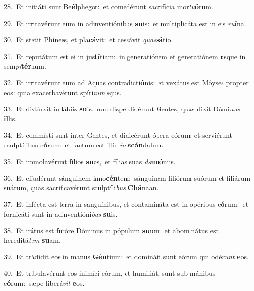 {\numbfont\textcolor{\numbcolor}{28.}}~Et initiáti sunt Be\-\textbf{él}\-phegor:~\star et comedérunt sacrifícia mor\-\textit{tu}\-\textbf{ó}rum.\par
{\numbfont\textcolor{\numbcolor}{29.}}~Et irritavérunt eum in adinventiónibus \textbf{su}\-is:~\star et multiplicáta est in eis \textit{ru}\-\textbf{í}na.\par
{\numbfont\textcolor{\numbcolor}{30.}}~Et stetit Phínees, et pla\-\textbf{cá}\-vit:~\star et cessávit \textit{quas}\-\textbf{sá}tio.\par
{\numbfont\textcolor{\numbcolor}{31.}}~Et reputátum est ei in jus\-\textbf{tí}\-tiam:~\star in generatiónem et generatiónem usque in sem\-\textit{pi}\-\textbf{tér}num.\par
{\numbfont\textcolor{\numbcolor}{32.}}~Et irritavérunt eum ad Aquas contradicti\-\textbf{ó}\-nis:~\star et vexátus est Móyses propter eos: quia exacerbavérunt spíri\textit{tum} \textbf{e}\-jus.\par
{\numbfont\textcolor{\numbcolor}{33.}}~Et distínxit in lábiis \textbf{su}\-is:~\star non disperdidérunt Gentes, quas dixit Dómi\textit{nus} \textbf{il}\-lis.\par
{\numbfont\textcolor{\numbcolor}{34.}}~Et commísti sunt inter Gentes, et didicérunt ópera eórum: et serviérunt sculptílibus e\-\textbf{ó}\-rum:~\star et factum est illis \textit{in} \textbf{scán}\-dalum.\par
{\numbfont\textcolor{\numbcolor}{35.}}~Et immolavérunt fílios \textbf{su}\-os,~\star et fílias suas \textit{dæ}\-\textbf{mó}niis.\par
{\numbfont\textcolor{\numbcolor}{36.}}~Et effudérunt sánguinem inno\-\textbf{cén}\-tem:~\star sánguinem filiórum suórum et filiárum suárum, quas sacrificavérunt sculptíli\textit{bus} \textbf{Chá}\-naan.\par
{\numbfont\textcolor{\numbcolor}{37.}}~Et infécta est terra in sanguínibus, et contamináta est in opéribus e\-\textbf{ó}\-rum:~\star et fornicáti sunt in adinventióni\textit{bus} \textbf{su}\-is.\par
{\numbfont\textcolor{\numbcolor}{38.}}~Et irátus est furóre Dóminus in pópulum \textbf{su}\-um:~\star et abominátus est hereditá\textit{tem} \textbf{su}\-am.\par
{\numbfont\textcolor{\numbcolor}{39.}}~Et trádidit eos in manus \textbf{Gén}\-tium:~\star et domináti sunt eórum qui odé\textit{runt} \textbf{e}\-os.\par
{\numbfont\textcolor{\numbcolor}{40.}}~Et tribulavérunt eos inimíci eórum, et humiliáti sunt sub mánibus e\-\textbf{ó}\-rum:~\star sæpe liberá\textit{vit} \textbf{e}\-os.\par
